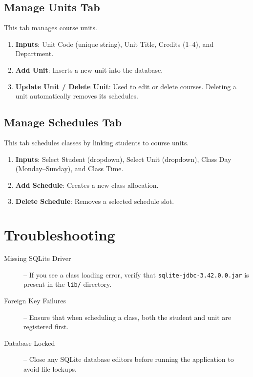 \documentclass[11pt,a4paper]{article}
\begin{document}
\subsection{Manage Units Tab}
This tab manages course units.
\begin{enumerate}
    \item \textbf{Inputs}: Unit Code (unique string), Unit Title, Credits (1--4), and Department.
    \item \textbf{Add Unit}: Inserts a new unit into the database.
    \item \textbf{Update Unit / Delete Unit}: Used to edit or delete courses. Deleting a unit automatically removes its schedules.
\end{enumerate}

\subsection{Manage Schedules Tab}
This tab schedules classes by linking students to course units.
\begin{enumerate}
    \item \textbf{Inputs}: Select Student (dropdown), Select Unit (dropdown), Class Day (Monday--Sunday), and Class Time.
    \item \textbf{Add Schedule}: Creates a new class allocation.
    \item \textbf{Delete Schedule}: Removes a selected schedule slot.
\end{enumerate}

\section{Troubleshooting}
\begin{description}
    \item[Missing SQLite Driver] -- If you see a class loading error, verify that \texttt{sqlite-jdbc-3.42.0.0.jar} is present in the \texttt{lib/} directory.
    \item[Foreign Key Failures] -- Ensure that when scheduling a class, both the student and unit are registered first.
    \item[Database Locked] -- Close any SQLite database editors before running the application to avoid file lockups.
\end{description}
\end{document}
